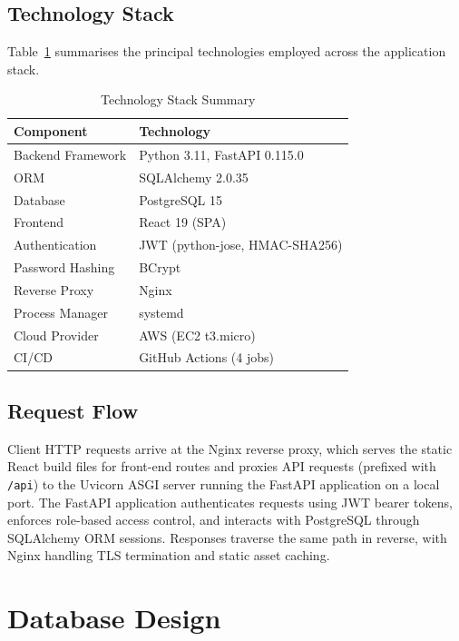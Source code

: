 \documentclass[conference]{IEEEtran}
\begin{document}
\subsection{Technology Stack}

Table~\ref{tab:techstack} summarises the principal technologies employed across the application stack.

\begin{table}[h]
\centering
\caption{Technology Stack Summary}
\label{tab:techstack}
\begin{tabular}{@{}p{2.2cm}p{5.5cm}@{}}
\toprule
\textbf{Component} & \textbf{Technology} \\
\midrule
Backend Framework & Python 3.11, FastAPI 0.115.0 \\
ORM & SQLAlchemy 2.0.35 \\
Database & PostgreSQL 15 \\
Frontend & React 19 (SPA) \\
Authentication & JWT (python-jose, HMAC-SHA256) \\
Password Hashing & BCrypt \\
Reverse Proxy & Nginx \\
Process Manager & systemd \\
Cloud Provider & AWS (EC2 t3.micro) \\
CI/CD & GitHub Actions (4 jobs) \\
\bottomrule
\end{tabular}
\end{table}

\subsection{Request Flow}

Client HTTP requests arrive at the Nginx reverse proxy, which serves the static React build files for front-end routes and proxies API requests (prefixed with \texttt{/api}) to the Uvicorn ASGI server running the FastAPI application on a local port. The FastAPI application authenticates requests using JWT bearer tokens, enforces role-based access control, and interacts with PostgreSQL through SQLAlchemy ORM sessions. Responses traverse the same path in reverse, with Nginx handling TLS termination and static asset caching.

\section{Database Design}
\label{sec:database}
\end{document}
